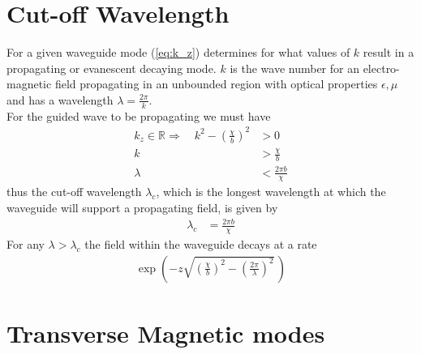 \documentclass[twoside, a4paper]{article}
\begin{document}
\section{Cut-off Wavelength}

For a given waveguide mode (\ref{eq:k_z}) determines for what values of $k$ result in a propagating or evanescent decaying mode. $k$ is the wave number for an electro-magnetic field propagating in an unbounded region with optical properties $\epsilon, \mu$ and has a wavelength $\lambda = \frac{2 \pi}{k}$. \\
For the guided wave to be propagating we must have
\begin{align*}
	\label{eq:coaxial-TM-cut-off}
	k_z \in \mathbb{R}
	\Rightarrow \quad
	k^2 - \left( \frac{\chi}{b} \right)^2 & > 0
	\\
	k & > \frac{\chi}{b}
	\\
	\lambda & < \frac{2 \pi b}{\chi}
\end{align*}
thus the cut-off wavelength $\lambda_c$, which is the longest wavelength at which the waveguide will support a propagating field, is given by
\begin{align}
	\lambda_c & = \frac{2 \pi b}{\chi} 
\end{align}
For any $\lambda > \lambda_c$ the field within the waveguide decays at a rate
\begin{align*}
	\exp 
	\left(
	- z \sqrt{ \left( \frac{ \chi}{b} \right) ^2 - \left( \frac{ 2 \pi }{\lambda}\right)^2} 
	\,
	\right)
\end{align*}

\section{Transverse Magnetic modes}
\end{document}
